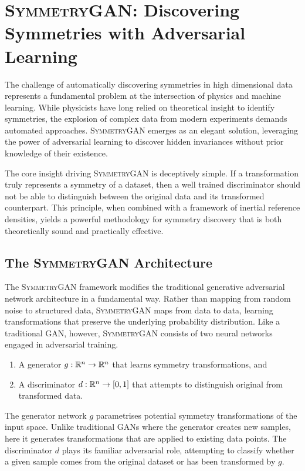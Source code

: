 \section{\textsc{SymmetryGAN}: Discovering Symmetries with Adversarial Learning}
\label{sec:symmetry-gan-main}
The challenge of automatically discovering symmetries in high dimensional data represents a fundamental problem at the intersection of physics and machine learning.
%
While physicists have long relied on theoretical insight to identify symmetries, the explosion of complex data from modern experiments demands automated approaches.
%
\textsc{SymmetryGAN} emerges as an elegant solution, leveraging the power of adversarial learning to discover hidden invariances without prior knowledge of their existence.

The core insight driving \textsc{SymmetryGAN} is deceptively simple.
%
If a transformation truly represents a symmetry of a dataset, then a well trained discriminator should not be able to distinguish between the original data and its transformed counterpart.
%
This principle, when combined with a framework of inertial reference densities, yields a powerful methodology for symmetry discovery that is both theoretically sound and practically effective.
    \subsection{The \textsc{SymmetryGAN} Architecture}
    The \textsc{SymmetryGAN} framework modifies the traditional generative adversarial network architecture in a fundamental way.
    Rather than mapping from random noise to structured data, \textsc{SymmetryGAN} maps from data to data, learning transformations that preserve the underlying probability distribution.
    Like a traditional GAN, however, \textsc{SymmetryGAN} consists of two neural networks engaged in adversarial training.
    \begin{enumerate}
        \item A generator \(g: \mathbb{R}^n \to \mathbb{R}^n\) that learns symmetry transformations, and
        \item A discriminator \(d: \mathbb{R}^n \to [0, 1]\) that attempts to distinguish original from transformed data.
    \end{enumerate}
    The generator network \(g\) parametrises potential symmetry transformations of the input space.
    Unlike traditional GANs where the generator creates new samples, here it generates transformations that are applied to existing data points.
    The discriminator \(d\) plays its familiar adversarial role, attempting to classify whether a given sample comes from the original dataset or has been transformed by \(g\).

